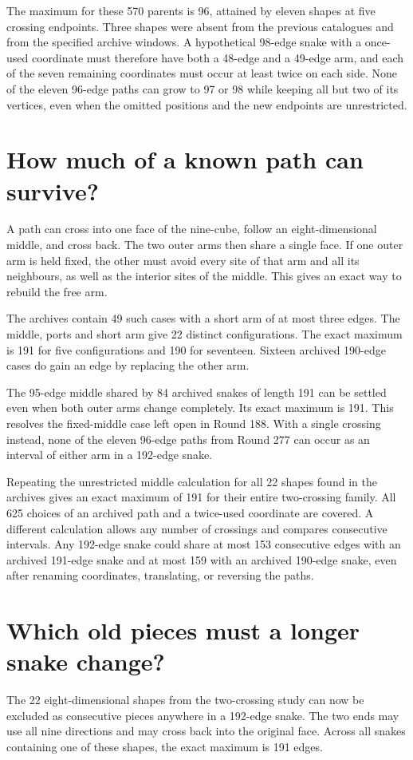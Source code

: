 \documentclass[11pt,a4paper]{article}
\begin{document}
The maximum for these 570 parents is 96, attained by eleven shapes at five crossing endpoints. Three shapes were absent from the previous catalogues and from the specified archive windows. A hypothetical 98-edge snake with a once-used coordinate must therefore have both a 48-edge and a 49-edge arm, and each of the seven remaining coordinates must occur at least twice on each side. None of the eleven 96-edge paths can grow to 97 or 98 while keeping all but two of its vertices, even when the omitted positions and the new endpoints are unrestricted.

\section{How much of a known path can survive?}
A path can cross into one face of the nine-cube, follow an eight-dimensional middle, and cross back. The two outer arms then share a single face. If one outer arm is held fixed, the other must avoid every site of that arm and all its neighbours, as well as the interior sites of the middle. This gives an exact way to rebuild the free arm.

The archives contain 49 such cases with a short arm of at most three edges. The middle, ports and short arm give 22 distinct configurations. The exact maximum is 191 for five configurations and 190 for seventeen. Sixteen archived 190-edge cases do gain an edge by replacing the other arm.

The 95-edge middle shared by 84 archived snakes of length 191 can be settled even when both outer arms change completely. Its exact maximum is 191. This resolves the fixed-middle case left open in Round 188. With a single crossing instead, none of the eleven 96-edge paths from Round 277 can occur as an interval of either arm in a 192-edge snake.

Repeating the unrestricted middle calculation for all 22 shapes found in the archives gives an exact maximum of 191 for their entire two-crossing family. All 625 choices of an archived path and a twice-used coordinate are covered. A different calculation allows any number of crossings and compares consecutive intervals. Any 192-edge snake could share at most 153 consecutive edges with an archived 191-edge snake and at most 159 with an archived 190-edge snake, even after renaming coordinates, translating, or reversing the paths.

\section{Which old pieces must a longer snake change?}
The 22 eight-dimensional shapes from the two-crossing study can now be excluded as consecutive pieces anywhere in a 192-edge snake. The two ends may use all nine directions and may cross back into the original face. Across all snakes containing one of these shapes, the exact maximum is 191 edges.
\end{document}
